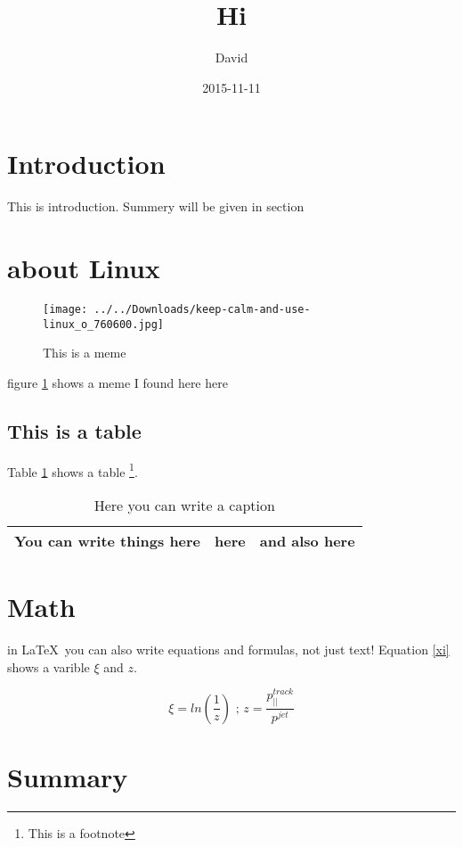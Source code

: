 \documentclass[12pt]{article}
\author{David}
\title{Hi}
\date{2015-11-11}
\begin{document}
\maketitle
\section{Introduction}
This is introduction. Summery will be given in section 


\section{about Linux}


\begin{figure}[H]
\begin{center}
\texttt{[image: ../../Downloads/keep-calm-and-use-linux\_o\_760600.jpg]} 
\caption{This is a meme \cite{meme}}
\label{linux}
\end{center}
\end{figure}


figure \ref{linux} shows a meme I found here here \cite{meme}

\subsection{This is a table}

Table \ref{stuff} shows a table \footnote{This is a footnote}.

\begin{table}[H]
	\centering
	 \caption{Here you can write a caption}
    \begin{tabular}{|c|c|c|}\hline
    \label{stuff} 
    You can write things here & here & and also here\\\hline
    \end{tabular}  
        
\end{table}

\section{Math}
in \LaTeX \ you can also write equations and formulas, not just text!
Equation \ref{xi} shows a varible $\xi$ and $z$.

\begin{equation}
\xi = ln\left( \frac{1}{z} \right) \text{ ; } z= \frac{p^{track}_{||}}{p^{jet}}
\label{xi}
\end{equation}


\section{Summary}
\end{document}
